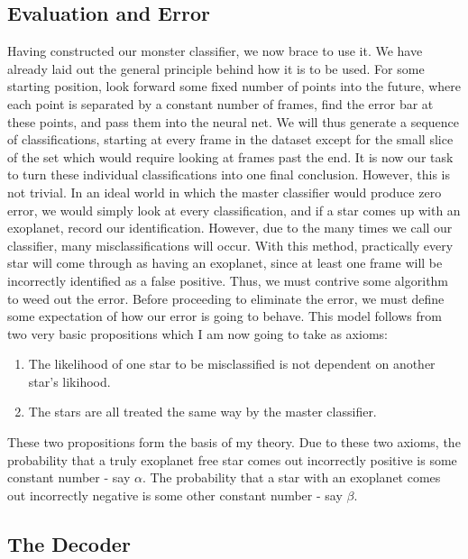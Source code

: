 \documentclass[twocolumn]{article}
\begin{document}
\subsection{Evaluation and Error}
\indent \indent Having constructed our monster classifier, we now brace to use it. We have already laid out the general principle behind how it is to be used. For some starting position, look forward some fixed number of points into the future, where each point is separated by a constant number of frames, find the error bar at these points, and pass them into the neural net. We will thus generate a sequence of classifications, starting at every frame in the dataset except for the small slice of the set which would require looking at frames past the end.
\newline
\indent It is now our task to turn these individual classifications into one final conclusion. However, this is not trivial. In an ideal world in which the master classifier would produce zero error, we would simply look at every classification, and if a star comes up with an exoplanet, record our identification. However, due to the many times we call our classifier, many misclassifications will occur. With this method, practically every star will come through as having an exoplanet, since at least one frame will be incorrectly identified as a false positive. Thus, we must contrive some algorithm to weed out the error.
\newline
\indent Before proceeding to eliminate the error, we must define some expectation of how our error is going to behave. This model follows from two very basic propositions which I am now going to take as axioms:
\begin{enumerate}
\item The likelihood of one star to be misclassified is not dependent on another star's likihood.
\item The stars are all treated the same way by the master classifier.
\end{enumerate}
These two propositions form the basis of my theory. Due to these two axioms, the probability that a truly exoplanet free star comes out incorrectly positive is some constant number - say $ \alpha $. The probability that a star with an exoplanet comes out incorrectly negative is some other constant number - say $ \beta $. 
\subsection{The Decoder}
\end{document}
